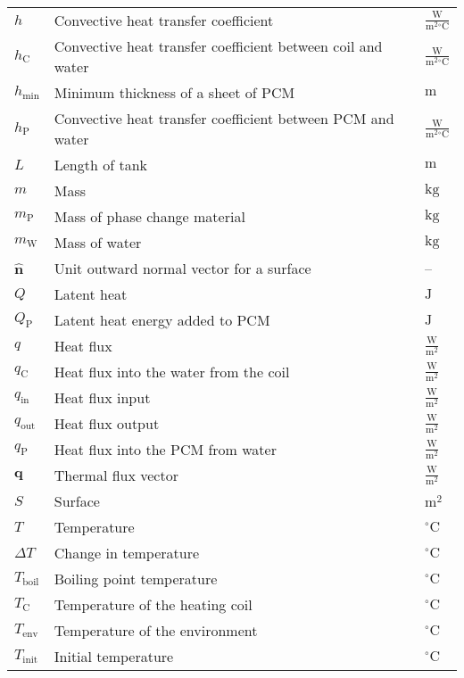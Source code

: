\documentclass[12pt]{article}
\begin{document}
\begin{longtabu}{l X[l] l}
\\
$h$ & Convective heat transfer coefficient & $\frac{\text{W}}{\text{m}^{2}{}^{\circ}\text{C}}$
\\
${h_{\text{C}}}$ & Convective heat transfer coefficient between coil and water & $\frac{\text{W}}{\text{m}^{2}{}^{\circ}\text{C}}$
\\
${h_{\text{min}}}$ & Minimum thickness of a sheet of PCM & ${\text{m}}$
\\
${h_{\text{P}}}$ & Convective heat transfer coefficient between PCM and water & $\frac{\text{W}}{\text{m}^{2}{}^{\circ}\text{C}}$
\\
$L$ & Length of tank & ${\text{m}}$
\\
$m$ & Mass & ${\text{kg}}$
\\
${m_{\text{P}}}$ & Mass of phase change material & ${\text{kg}}$
\\
${m_{\text{W}}}$ & Mass of water & ${\text{kg}}$
\\
$\mathbf{\hat{n}}$ & Unit outward normal vector for a surface & --
\\
$Q$ & Latent heat & ${\text{J}}$
\\
${Q_{\text{P}}}$ & Latent heat energy added to PCM & ${\text{J}}$
\\
$q$ & Heat flux & $\frac{\text{W}}{\text{m}^{2}}$
\\
${q_{\text{C}}}$ & Heat flux into the water from the coil & $\frac{\text{W}}{\text{m}^{2}}$
\\
${q_{\text{in}}}$ & Heat flux input & $\frac{\text{W}}{\text{m}^{2}}$
\\
${q_{\text{out}}}$ & Heat flux output & $\frac{\text{W}}{\text{m}^{2}}$
\\
${q_{\text{P}}}$ & Heat flux into the PCM from water & $\frac{\text{W}}{\text{m}^{2}}$
\\
$\mathbf{q}$ & Thermal flux vector & $\frac{\text{W}}{\text{m}^{2}}$
\\
$S$ & Surface & ${\text{m}^{2}}$
\\
$T$ & Temperature & ${{}^{\circ}\text{C}}$
\\
$ΔT$ & Change in temperature & ${{}^{\circ}\text{C}}$
\\
${T_{\text{boil}}}$ & Boiling point temperature & ${{}^{\circ}\text{C}}$
\\
${T_{\text{C}}}$ & Temperature of the heating coil & ${{}^{\circ}\text{C}}$
\\
${T_{\text{env}}}$ & Temperature of the environment & ${{}^{\circ}\text{C}}$
\\
${T_{\text{init}}}$ & Initial temperature & ${{}^{\circ}\text{C}}$

\end{longtabu}
\end{document}
